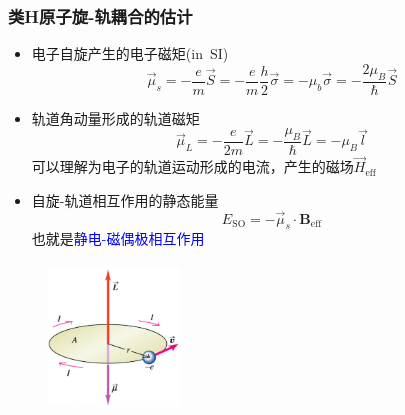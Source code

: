 \frame
{
	\frametitle{类\textrm{H}原子旋-轨耦合的估计}
\begin{minipage}{0.58\textwidth}
	\begin{itemize}
		\item 电子自旋产生的电子磁矩\textrm{(in~SI)}
			\begin{displaymath}
				\vec\mu_s=-\dfrac{e}{m}\vec S=-\dfrac{e}{m}\dfrac{h}2\vec\sigma=-\mu_b\vec\sigma=-\dfrac{2\mu_B}{\hbar}\vec S
			\end{displaymath}
		\item 轨道角动量形成的轨道磁矩
			\begin{displaymath}
				\vec\mu_L=-\dfrac{e}{2m}\vec L=-\dfrac{\mu_B}{\hbar}\vec L=-\mu_B\vec l
			\end{displaymath}
			可以理解为电子的轨道运动形成的电流，产生的磁场$\vec H_{\mathrm{eff}}$
		\item 自旋-轨道相互作用的静态能量
			\begin{displaymath}
				E_{\mathrm{SO}}=-\vec\mu_s\cdot\mathbf{B}_{\mathrm{eff}}
			\end{displaymath}
			也就是\textcolor{blue}{静电-磁偶极相互作用}
	\end{itemize}
\end{minipage}
\begin{minipage}{0.40\textwidth}
\begin{figure}[h!]
\centering
\vspace{+0.3in}
\includegraphics[height=1.55in,width=1.38in,viewport=0 0 760 800,clip]{Figures/SOC_spin-orbit.png}
\label{SOC_spin-orbit}
\end{figure}
\end{minipage}
}


